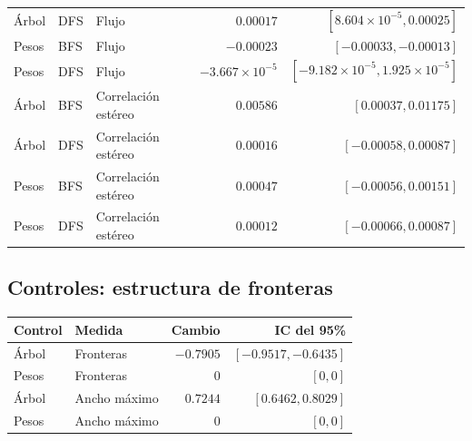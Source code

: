 \documentclass[11pt,a4paper]{article}
\begin{document}
{\begin{longtable}{lllrr}
Árbol & DFS & Flujo & $0.00017$ & $[8.604\times10^{-5}, 0.00025]$ \\
Pesos & BFS & Flujo & $-0.00023$ & $[-0.00033, -0.00013]$ \\
Pesos & DFS & Flujo & $-3.667\times10^{-5}$ & $[-9.182\times10^{-5}, 1.925\times10^{-5}]$ \\
Árbol & BFS & Correlación estéreo & $0.00586$ & $[0.00037, 0.01175]$ \\
Árbol & DFS & Correlación estéreo & $0.00016$ & $[-0.00058, 0.00087]$ \\
Pesos & BFS & Correlación estéreo & $0.00047$ & $[-0.00056, 0.00151]$ \\
Pesos & DFS & Correlación estéreo & $0.00012$ & $[-0.00066, 0.00087]$ \\
\bottomrule
\end{longtable}}

\subsection{Controles: estructura de fronteras}
{\small\setlength{\tabcolsep}{5pt}
\begin{longtable}{llrr}
\toprule
Control & Medida & Cambio & IC del 95\% \\
\midrule\endhead
Árbol & Fronteras & $-0.7905$ & $[-0.9517, -0.6435]$ \\
Pesos & Fronteras & $0$ & $[0, 0]$ \\
Árbol & Ancho máximo & $0.7244$ & $[0.6462, 0.8029]$ \\
Pesos & Ancho máximo & $0$ & $[0, 0]$ \\
\bottomrule
\end{longtable}}
\end{document}
